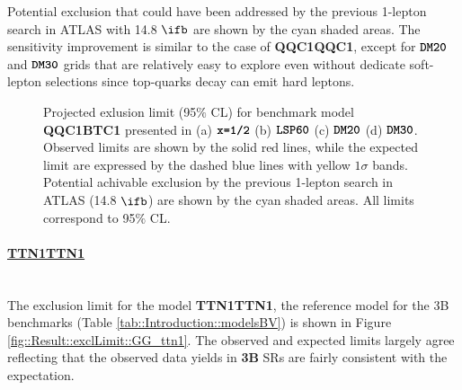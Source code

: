 Potential exclusion that could have been addressed by the previous 1-lepton search in ATLAS with 14.8 $\ifb$ \cite{strong1L_ICHEP2016_CONF} are shown by the cyan shaded areas. The sensitivity improvement is similar to the case of \textbf{QQC1QQC1},
except for $\mathrm{\textbf{\texttt{DM20}}}$ and $\mathrm{\textbf{\texttt{DM30}}}$ grids that are relatively easy to explore even without dedicate soft-lepton selections since top-quarks decay can emit hard leptons. 

\begin{figure}[h]
  \centering
    \caption{Projected exlusion limit (95$\%$ CL) for benchmark model \textbf{QQC1BTC1} presented in (a) $\mathrm{\textbf{\texttt{x=1/2}}}$ (b) $\mathrm{\textbf{\texttt{LSP60}}}$ (c) $\mathrm{\textbf{\texttt{DM20}}}$ (d) $\mathrm{\textbf{\texttt{DM30}}}$. Observed limits are shown by the solid red lines, while the expected limit are expressed by the dashed blue lines with yellow $1\sigma$ bands. 
Potential achivable exclusion by the previous 1-lepton search in ATLAS (14.8 $\ifb$) \cite{strong1L_ICHEP2016_CONF} are shown by the cyan shaded areas. 
All limits correspond to 95$\%$ CL.
\label{fig::Result::exclLimit::GG_QQC1BTC1} }
\end{figure}



\clearpage
\paragraph{\underline{\textbf{TTN1TTN1}}} \mbox{} \\ 
The exclusion limit for the model \textbf{TTN1TTN1}, the reference model for the 3B benchmarks (Table \ref{tab::Introduction::modelsBV}) is shown in Figure \ref{fig::Result::exclLimit::GG_ttn1}. The observed and expected limits largely agree reflecting that the observed data yields in \textbf{3B} SRs are fairly consistent with the expectation.  \\

